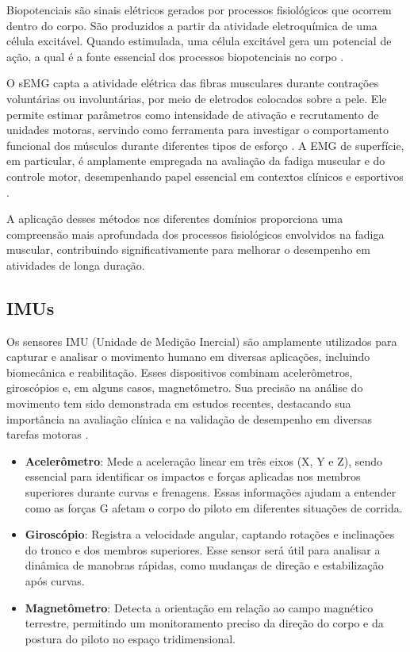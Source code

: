 \documentclass[symbols]{fei}
\begin{document}
Biopotenciais são sinais elétricos gerados por processos fisiológicos que ocorrem dentro do corpo. São produzidos a  partir da 
atividade eletroquímica de uma célula excitável. Quando estimulada, uma célula excitável gera um potencial de ação, a qual é a 
fonte essencial dos processos biopotenciais no corpo \cite{macy2025}.

O sEMG capta a atividade elétrica das fibras musculares durante contrações voluntárias ou involuntárias, 
por meio de eletrodos colocados sobre a pele. Ele permite estimar parâmetros como intensidade de ativação e recrutamento de unidades motoras, 
servindo como ferramenta para investigar o comportamento funcional dos músculos durante diferentes tipos de esforço \cite{farina2016_biophysics, merletti2023_current_sEMG}.  
A EMG de superfície, em particular, é amplamente empregada na avaliação da fadiga muscular e do controle motor, desempenhando papel essencial em contextos clínicos e 
esportivos \cite{deLuca2016_surfaceEMG}.

A aplicação desses métodos nos diferentes domínios proporciona uma compreensão mais aprofundada dos processos fisiológicos envolvidos 
na fadiga muscular, contribuindo significativamente para melhorar o desempenho em atividades de longa duração.\cite{thelastarticle}

\subsection{IMUs}
Os sensores IMU (Unidade de Medição Inercial) são amplamente utilizados para capturar e analisar o movimento humano em diversas 
aplicações, incluindo biomecânica e reabilitação. Esses dispositivos combinam acelerômetros, giroscópios e, em alguns casos, magnetômetro.
Sua precisão na análise do movimento tem sido demonstrada em estudos recentes, destacando sua importância na avaliação clínica e na 
validação de desempenho em diversas tarefas motoras \cite{meng2023,favata2024}.

\begin{itemize}
    \item \textbf{Acelerômetro}:
    Mede a aceleração linear em três eixos (X, Y e Z), sendo essencial para identificar os impactos e forças aplicadas nos membros superiores durante 
    curvas e frenagens. Essas informações ajudam a entender como as forças G afetam o corpo do piloto em diferentes situações de corrida.

    \item \textbf{Giroscópio}:
    Registra a velocidade angular, captando rotações e inclinações do tronco e dos membros superiores. Esse sensor será útil 
    para analisar a dinâmica de manobras rápidas, como mudanças de direção e estabilização após curvas.

    \item \textbf{Magnetômetro}:
    Detecta a orientação em relação ao campo magnético terrestre, permitindo um monitoramento preciso da direção do corpo e 
    da postura do piloto no espaço tridimensional.
\end{itemize}
\end{document}
